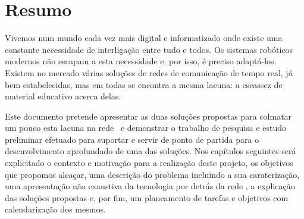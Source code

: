 \chapter*{Resumo}

Vivemos num mundo cada vez mais digital e informatizado onde existe uma
constante necessidade de interligação entre tudo e todos. Os sistemas
robóticos modernos não escapam a esta necessidade e, por isso, é preciso
adaptá-los. Existem no mercado várias soluções de redes de comunicação
de tempo real, já bem estabelecidas, mas em todas se encontra a mesma
lacuna: a escassez de material educativo acerca delas.

Este documento pretende apresentar as duas soluções propostas para colmatar
um pouco esta lacuna na rede \ecat\ e demonstrar o trabalho de pesquisa
e estudo preliminar efetuado para suportar e servir de ponto de partida
para o desenvolvimento aprofundado de uma das soluções. Nos capítulos
seguintes será explicitado o contexto e motivação para a realização deste
projeto, os objetivos que propomos alcaçar, uma descrição do problema
incluindo a sua caraterização, uma apresentação não exaustiva da tecnologia
por detrás da rede \ecat, a explicação das soluções propostas e, por fim,
um planeamento de tarefas e objetivos com calendarização dos mesmos.
